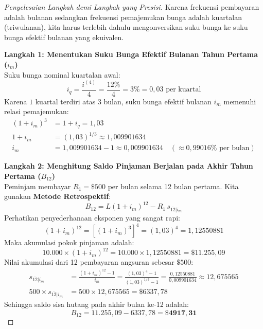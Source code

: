 \documentclass[11pt,a4paper]{article}
\begin{document}
\begin{proof}[Penyelesaian Langkah demi Langkah yang Presisi]
Karena frekuensi pembayaran adalah bulanan sedangkan frekuensi pemajemukan bunga adalah kuartalan (triwulanan), kita harus terlebih dahulu mengonversikan suku bunga ke suku bunga efektif bulanan yang ekuivalen.

\noindent\textbf{Langkah 1: Menentukan Suku Bunga Efektif Bulanan Tahun Pertama ($i_m$)}\\[0.3em]
Suku bunga nominal kuartalan awal:
\begin{equation*}
    i_q = \frac{i^{(4)}}{4} = \frac{12\%}{4} = 3\% = 0{,}03 \text{ per kuartal}
\end{equation*}
Karena $1$ kuartal terdiri atas $3$ bulan, suku bunga efektif bulanan $i_m$ memenuhi relasi pemajemukan:
\begin{align*}
    (1 + i_m)^3 &= 1 + i_q = 1{,}03 \\
    1 + i_m &= (1{,}03)^{1/3} \approx 1{,}009901634 \\
    i_m &= 1{,}009901634 - 1 \approx 0{,}009901634 \quad (\approx 0{,}99016\% \text{ per bulan})
\end{align*}

\noindent\textbf{Langkah 2: Menghitung Saldo Pinjaman Berjalan pada Akhir Tahun Pertama ($B_{12}$)}\\[0.3em]
Peminjam membayar $R_1 = \$500$ per bulan selama 12 bulan pertama. Kita gunakan \textbf{Metode Retrospektif}:
\begin{equation*}
    B_{12} = L(1 + i_m)^{12} - R_1 \, s_{\overline{12}|i_m}
\end{equation*}
Perhatikan penyederhanaan eksponen yang sangat rapi:
\begin{equation*}
    (1 + i_m)^{12} = \left[ (1 + i_m)^3 \right]^4 = (1{,}03)^4 = 1{,}12550881
\end{equation*}
Maka akumulasi pokok pinjaman adalah:
\begin{equation*}
    10.000 \times (1 + i_m)^{12} = 10.000 \times 1{,}12550881 = \$11.255{,}09
\end{equation*}
Nilai akumulasi dari 12 pembayaran angsuran sebesar $\$500$:
\begin{align*}
    s_{\overline{12}|i_m} &= \frac{(1 + i_m)^{12} - 1}{i_m} = \frac{(1{,}03)^4 - 1}{(1{,}03)^{1/3} - 1} = \frac{0{,}12550881}{0{,}009901634} \approx 12{,}675565 \\
    500 \times s_{\overline{12}|i_m} &= 500 \times 12{,}675565 = \$6337{,}78
\end{align*}
Sehingga saldo sisa hutang pada akhir bulan ke-12 adalah:
\begin{equation*}
    B_{12} = 11.255{,}09 - 6337{,}78 = \mathbf{\$4917{,}31}
\end{equation*}


\end{proof}
\end{document}
